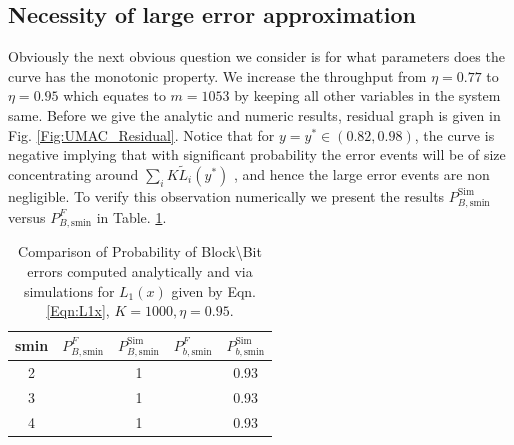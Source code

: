 
\subsection{Necessity of large error approximation}
Obviously the next obvious question we consider is for what parameters does the curve has the monotonic property. We increase the throughput from $\eta=0.77$ to $\eta=0.95$ which equates to $m=1053$ by keeping all other variables in the system same. Before we give the analytic and numeric results, residual graph is given in Fig. \ref{Fig:UMAC_Residual}. Notice that for $y=y^*\in(0.82,0.98)$, the curve is negative implying that with significant probability the error events will be of size concentrating around $\sum_{i}K\tilde{L}_{i}(y^*)$ , and hence the large error events are non negligible. To verify this observation numerically we present the results  $P_{B,\text{smin}}^{\text{Sim}}$ versus $P_{B,\text{smin}}^F$ in Table. \ref{Table:SimvsAnalytic3}.
%

\begin{table}
\centering
\begin{tabular}{c c c c c}
\hline  \hline
smin & $P_{B,\text{smin}}^F$ & $P_{B,\text{smin}}^{\text{Sim}}$& $P_{b,\text{smin}}^{F}$ &$P_{b,\text{smin}}^{\text{Sim}}$\\
\hline
2 &   &1 & &0.93\\
3 &  &1 & &0.93\\
4 &  &1 & &0.93\\
\end{tabular}
\caption{Comparison of Probability of Block\textbackslash Bit errors computed analytically and via simulations for $L_1(x)$ given by Eqn. \eqref{Eqn:L1x}, $K=1000, \eta=0.95$.}
\label{Table:SimvsAnalytic3}
\end{table}